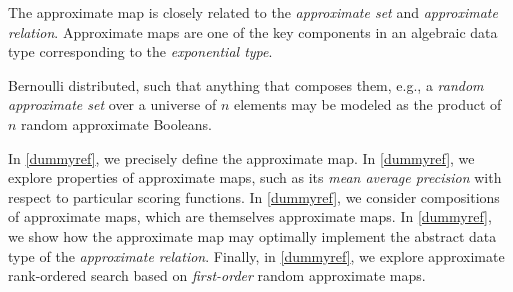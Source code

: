 \documentclass[ ../main.tex]{subfiles}
\begin{document}
The approximate map is closely related to the \emph{approximate set}\cite{aset} and \emph{approximate relation}\cite{arelation}.
Approximate maps are one of the key components in an algebraic data type corresponding to the \emph{exponential type}.


Bernoulli distributed, such that anything that composes them, e.g., a \emph{random approximate set} over a universe of $n$ elements may be modeled as the product of $n$ random approximate Booleans.



In \cref{dummyref}, we precisely define the approximate map.
In \cref{dummyref}, we explore properties of approximate maps, such as its \emph{mean average precision} with respect to particular scoring functions.
In \cref{dummyref}, we consider compositions of approximate maps, which are themselves approximate maps.
In \cref{dummyref}, we show how the approximate map may optimally implement the abstract data type of the \emph{approximate relation}.
Finally, in \cref{dummyref}, we explore approximate rank-ordered search based on \emph{first-order} random approximate maps.
\end{document}
